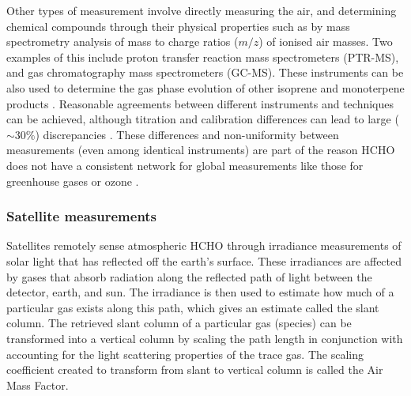     
    Other types of measurement involve directly measuring the air, and determining chemical compounds through their physical properties such as by mass spectrometry analysis of mass to charge ratios ($m/z$) of ionised air masses.
    Two examples of this include proton transfer reaction mass spectrometers (PTR-MS), and gas chromatography mass spectrometers (GC-MS).
    These instruments can be also used to determine the gas phase evolution of 
    other isoprene and monoterpene products 
    \parencite[e.g.,][]{Lee2006a, Nguyen2014, Wolfe2016, Lerner2017}.
    Reasonable agreements between different instruments and techniques can be 
    achieved, although titration and calibration differences can lead to large 
    ($\sim 30\%$) discrepancies \parencite[e.g.,][]{Hak2005}.
    These differences and non-uniformity between measurements (even among identical instruments) are part of the reason HCHO does not have a consistent network for global measurements like those for greenhouse gases or ozone \parencite{FortemsCheiney2012}.
  
    \subsubsection{Satellite measurements}
      \label{LR:HCHO:Sat}
      
      Satellites remotely sense atmospheric HCHO through irradiance measurements of solar light that has reflected off the earth's surface. 
      These irradiances are affected by gases that absorb radiation along the reflected path of light between the detector, earth, and sun. 
      The irradiance is then used to estimate how much of a particular gas exists along this path, which gives an estimate called the slant column.
      The retrieved slant column of a particular gas (species) can be transformed into a vertical column by scaling the path length in conjunction with accounting for the light scattering properties of the trace gas.
      The scaling coefficient created to transform from slant to vertical column is called the Air Mass Factor.
      
